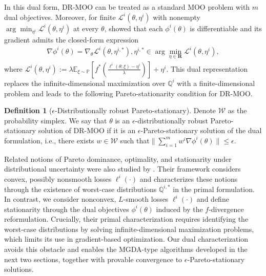 \documentclass[twoside]{article} %
\theoremstyle{plain}
\theoremstyle{definition}
\newtheorem{definition}[theorem]{Definition}
\theoremstyle{remark}
\newcommand{\fL}{\mathcal{L}}
\begin{document}
In this dual form, DR-MOO can be treated as a standard MOO problem with \(m\) dual objectives. Moreover, for finite $\mathcal L^i(\theta,\eta^i)$ with nonempty
$\arg\min_{\eta^i}\mathcal L^i(\theta,\eta^i)$ at every $\theta$, \citet{jinnonconvexdro} showed that each \(\phi^i(\theta)\) is differentiable and its gradient admits the closed-form expression
\begin{align}
\nabla \phi^i(\theta)=\nabla_\theta \fL^i(\theta,\eta^{i,*}),
\eta^{i,*}\in \arg\min_{\eta\in\mathbf{R}} \fL^i(\theta,\eta^i),\nonumber
\end{align}
where
\(
\fL^i(\theta,\eta^i) :=\lambda \mathbb{E}_{\xi\sim\mathbb{P}}
[f^*(\frac{\ell^i(\theta;\xi)-\eta^i}{\lambda})]+\eta^i
\).
This dual representation replaces the infinite-dimensional maximization over
$\mathbb{Q}^i$ with a finite-dimensional problem and leads to the following
Pareto-stationarity condition for DR-MOO.
\begin{definition}[$\epsilon$-Distributionally robust Pareto-stationary]\label{def: dr-pstationary}
   Denote $\mathcal{W}$ as the probability simplex. We say that $\theta$ is an $\epsilon$-distributionally robust Pareto-stationary solution of DR-MOO if it is an $\epsilon$-Pareto-stationary solution of the dual formulation, i.e., there exists $w \in \mathcal{W}$ such that$
    \| \sum_{i=1}^{m} w^i \nabla \phi^i(\theta)\| \leq \epsilon$.
\end{definition}
Related notions of Pareto dominance, optimality, and stationarity under
distributional uncertainty were also studied by \citet{DRMOOLatorre}. Their framework
considers convex, possibly nonsmooth losses $\ell^i(\cdot)$ and characterizes
these notions through the existence of worst-case distributions
$\mathbb{Q}^{i,*}$ in the primal formulation. In contrast, we consider
nonconvex, $L$-smooth losses $\ell^i(\cdot)$ and define stationarity through the dual objectives
$\phi^i(\theta)$ induced by the $f$-divergence reformulation. Crucially, their
primal characterization requires identifying the worst-case distributions by
solving infinite-dimensional maximization problems, which limits its use in
gradient-based optimization. Our dual characterization avoids this obstacle and
enables the MGDA-type algorithms developed in the next two sections, together
with provable convergence to $\epsilon$-Pareto-stationary solutions.
\end{document}

